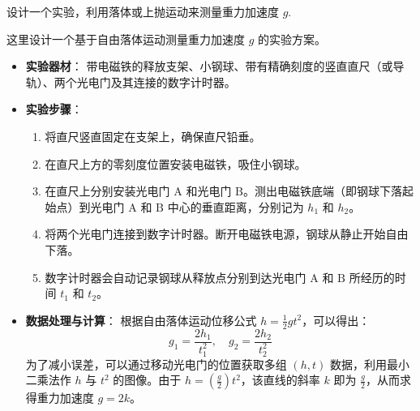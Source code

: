 \begin{exercise}\label{ex:2.4}
设计一个实验，利用落体或上抛运动来测量重力加速度 $g$.
\end{exercise}
\begin{solution}
这里设计一个基于自由落体运动测量重力加速度 $g$ 的实验方案。

\begin{itemize}
    \item \textbf{实验器材}：
    带电磁铁的释放支架、小钢球、带有精确刻度的竖直直尺（或导轨）、两个光电门及其连接的数字计时器。

    \item \textbf{实验步骤}：
    \begin{enumerate}
        \item 将直尺竖直固定在支架上，确保直尺铅垂。
        \item 在直尺上方的零刻度位置安装电磁铁，吸住小钢球。
        \item 在直尺上分别安装光电门 $\mathrm{A}$ 和光电门 $\mathrm{B}$。测出电磁铁底端（即钢球下落起始点）到光电门 $\mathrm{A}$ 和 $\mathrm{B}$ 中心的垂直距离，分别记为 $h_1$ 和 $h_2$。
        \item 将两个光电门连接到数字计时器。断开电磁铁电源，钢球从静止开始自由下落。
        \item 数字计时器会自动记录钢球从释放点分别到达光电门 $\mathrm{A}$ 和 $\mathrm{B}$ 所经历的时间 $t_1$ 和 $t_2$。
    \end{enumerate}

    \item \textbf{数据处理与计算}：
    根据自由落体运动位移公式 $h = \frac{1}{2}gt^2$，可以得出：
    $$ g_1 = \frac{2h_1}{t_1^2}, \quad g_2 = \frac{2h_2}{t_2^2} $$
    为了减小误差，可以通过移动光电门的位置获取多组 $(h, t)$ 数据，利用最小二乘法作 $h$ 与 $t^2$ 的图像。由于 $h = (\frac{g}{2}) t^2$，该直线的斜率 $k$ 即为 $\frac{g}{2}$，从而求得重力加速度 $g = 2k$。
\end{itemize}
\end{solution}


